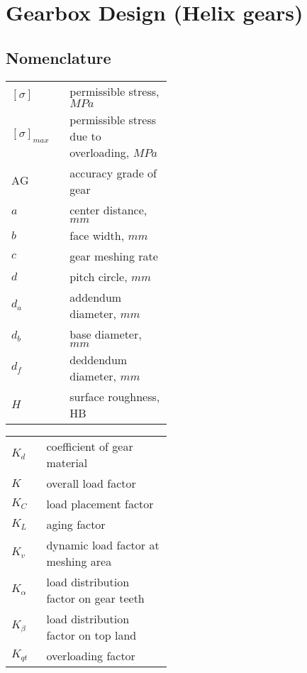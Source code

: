\chapter{Gearbox Design (Helix gears)}
\section*{Nomenclature}
\begin{tabular}[t]{p{0.1\linewidth}p{0.35\linewidth}}
	$ [\sigma] $ & permissible stress, $ \unit{MPa} $\\
	$ [\sigma]_{max} $ & permissible stress due to overloading, $ \unit{MPa} $\\
	$ \text{AG} $ & accuracy grade of gear\\
	$ a $ & center distance, $ \unit{mm} $\\
	$ b $ & face width, $ \unit{mm} $\\
	$ c $ & gear meshing rate\\
	$ d $ & pitch circle, $ \unit{mm} $\\
	$ d_a $ & addendum diameter, $ \unit{mm} $\\
	$ d_b $ & base diameter, $ \unit{mm} $\\
	$ d_f $ & deddendum diameter, $ \unit{mm} $\\
	$ H $ & surface roughness, HB\\
\end{tabular}
\begin{tabular}[t]{p{0.05\linewidth}p{0.4\linewidth}}
	$ K_d $ & coefficient of gear material\\	
	$ K $ & overall load factor\\
	$ K_{C} $ & load placement factor\\
	$ K_{L} $ & aging factor\\
	$ K_{v} $ & dynamic load factor at meshing area\\
	$ K_{\alpha} $ & load distribution factor on gear teeth\\
	$ K_{\beta} $ & load distribution factor on top land\\
	$ K_{qt} $ & overloading factor\\
\end{tabular}\newpage
